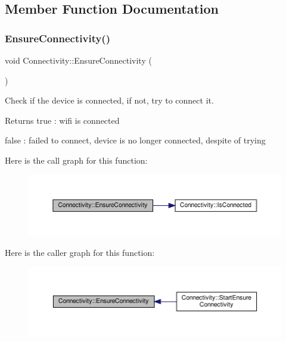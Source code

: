 \subsection{Member Function Documentation}
\mbox{\label{classConnectivity_ac97b309654c5c550f430c5cb45850d29}} 
\subsubsection{\texorpdfstring{Ensure\+Connectivity()}{EnsureConnectivity()}}
{\footnotesize\ttfamily void Connectivity\+::\+Ensure\+Connectivity (\begin{DoxyParamCaption}{ }\end{DoxyParamCaption})\hspace{0.3cm}{\ttfamily [private]}}



Check if the device is connected, if not, try to connect it. 

\begin{DoxyReturn}{Returns}
true \+: wifi is connected 

false \+: failed to connect, device is no longer connected, despite of trying 
\end{DoxyReturn}
Here is the call graph for this function\+:
\nopagebreak
\begin{figure}[H]
\begin{center}
\leavevmode
\includegraphics[width=350pt]{classConnectivity_ac97b309654c5c550f430c5cb45850d29_cgraph}
\end{center}
\end{figure}
Here is the caller graph for this function\+:
\nopagebreak
\begin{figure}[H]
\begin{center}
\leavevmode
\includegraphics[width=350pt]{classConnectivity_ac97b309654c5c550f430c5cb45850d29_icgraph}
\end{center}
\end{figure}
\mbox{\label{classConnectivity_a8bf62c0db2251d2c9072986eae231673}} 
